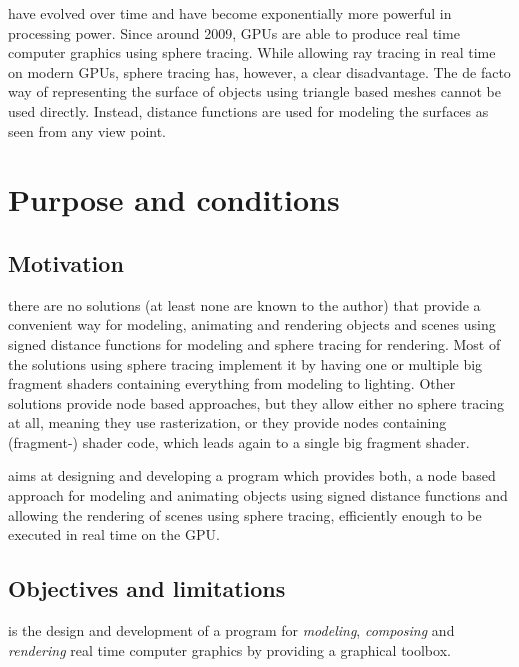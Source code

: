 \documentclass[%
    a4paper,    %
    justified,  %
    nobib,      %
    openany     %
]{tufte-book}
\begin{document}
 have evolved over time and have
become exponentially more powerful in processing power. Since around 2009, GPUs are able to
produce real time computer graphics using sphere tracing. While allowing ray
tracing in real time on modern GPUs, sphere tracing has, however, a clear
disadvantage. The de facto way of representing the surface of objects using triangle based
meshes cannot be used directly. Instead, distance functions are used for
modeling the surfaces as seen from any view point.

\section{Purpose and conditions}
\label{sec:purpose}

\subsection{Motivation}
\label{subsec:motivation}

 there are no solutions (at least none are
known to the author) that provide a convenient way for modeling, animating and
rendering objects and scenes using signed distance functions for modeling and
sphere tracing for rendering.
Most of the solutions using sphere tracing implement it by having one or
multiple big fragment shaders containing everything from modeling to lighting.
Other solutions provide node based approaches, but they allow either no sphere
tracing at all, meaning they use rasterization, or they provide nodes containing
(fragment-) shader code, which leads again to a single big fragment shader.

 aims at designing and developing a program which
provides both, a node based approach for modeling and animating objects using
signed distance functions and allowing the rendering of scenes using sphere
tracing, efficiently enough to be executed in real time on the GPU.

\subsection{Objectives and limitations}
\label{subsec:objectives}

 is the design and development of a
program for \textit{modeling}, \textit{composing} and \textit{rendering} real
time computer graphics by providing a graphical toolbox.
\end{document}

